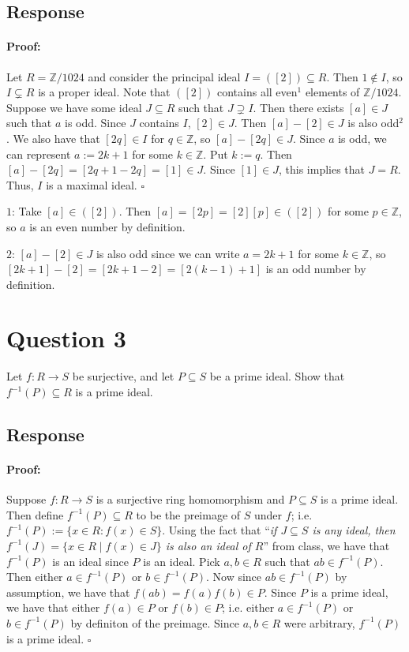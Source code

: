 \documentclass [12pt] {article}
\newcommand{\Z}{\mathbb{Z}}
\newenvironment{proof}{\paragraph{Proof:}}{\hfill$\square$}
\begin{document}
\subsection*{Response}
\begin{proof}
    Let $R = \Z/1024$ and consider the principal ideal $I = ([2]) \subseteq R$. Then $1 \not \in I$,
    so $I \subsetneq R$ is a proper ideal. Note that $([2])$ contains all even$^1$ elements of
    $\Z/1024$.
    Suppose we have some ideal $J \subseteq R$ such that $J \supsetneq I$. Then there
    exists $[a] \in J$ such that $a$ is odd. Since $J$ contains $I$, $[2] \in J$. 
    Then $[a] - [2] \in J$ is also odd$^2$. We also have that $[2q] \in I$ for 
    $q \in \Z$, so $[a] - [2q] \in J$. Since $a$ is odd, we can represent $a := 2k + 1$ for some $k \in \Z$. 
    Put $k := q$. Then $[a] - [2q] = [2q + 1 - 2q] = [1] \in J$. Since 
    $[1] \in J$, this implies that $J = R$. Thus, $I$ is a maximal ideal.
\end{proof}
\vspace{2em}

$1$: Take $[a] \in ([2])$. Then $[a] = [2p] = [2][p] \in ([2])$ for some $p \in \Z$, so $a$ is an
even number by definition.
\vspace{0.5em}

$2$: $[a] - [2] \in J$ is also odd since we can write $a = 2k + 1$ for some $k \in \Z$, so
$[2k + 1] - [2] = [2k + 1 - 2] = [2(k - 1) + 1]$ is an odd number by definition.

\newpage
\section*{Question 3}
\newcommand{\finv}{f^{-1}}
Let $f:R\to S$ be surjective, and let $P\subseteq S$ be a prime ideal. Show that $f^{-1}(P)\subseteq R$ is a prime ideal. 
\subsection*{Response}
\begin{proof}
    Suppose $f : R \to S$ is a surjective ring homomorphism and $P \subseteq S$ is a prime ideal. Then 
    define $\finv(P) \subseteq R$ to be the preimage of $S$ under $f$; i.e. $\finv(P) := \{ x \in R : f(x) \in S \}$.
    Using the fact that ``\textit{if $J \subseteq S$ is any ideal, then $\finv(J) = \{x \in R \mid f(x) \in J\}$
    is also an ideal of $R$}'' from class, we have that $\finv(P)$ is an ideal since $P$ is an ideal.
    Pick $a, b \in R$ such that $ab \in \finv(P)$. Then either $a \in \finv(P)$ or $b \in \finv(P)$. 
    Now since $ab \in \finv(P)$ by assumption, we have that $f(ab) = f(a)f(b)\in P$. 
    Since $P$ is a prime ideal, we have that either $f(a) \in P$ or $f(b) \in P$; i.e. either 
    $a \in \finv(P)$ or $b \in \finv(P)$ by definiton of the preimage. Since $a, b \in R$ were arbitrary,
    $\finv(P)$ is a prime ideal.
\end{proof}
\end{document}
